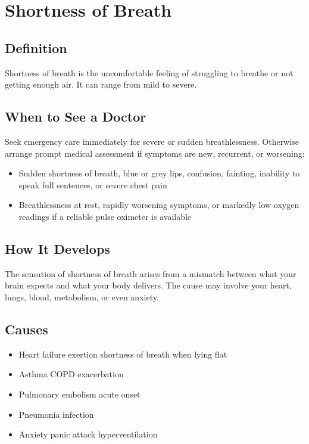 \chapter{Shortness of Breath}

\section*{Definition}
Shortness of breath is the uncomfortable feeling of struggling to breathe or not getting enough air. It can range from mild to severe.

\section*{When to See a Doctor}
Seek emergency care immediately for severe or sudden breathlessness. Otherwise arrange prompt medical assessment if symptoms are new, recurrent, or worsening:
\begin{itemize}
  \item Sudden shortness of breath, blue or grey lips, confusion, fainting, inability to speak full sentences, or severe chest pain
  \item Breathlessness at rest, rapidly worsening symptoms, or markedly low oxygen readings if a reliable pulse oximeter is available
\end{itemize}

\section*{How It Develops}
The sensation of shortness of breath arises from a mismatch between what your brain expects and what your body delivers. The cause may involve your heart, lungs, blood, metabolism, or even anxiety.

\section*{Causes}
\begin{itemize}
  \item Heart failure exertion shortness of breath when lying flat
  \item Asthma COPD exacerbation
  \item Pulmonary embolism acute onset
  \item Pneumonia infection
  \item Anxiety panic attack hyperventilation
\end{itemize}


